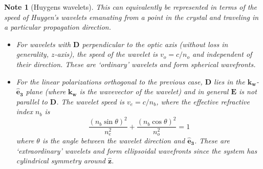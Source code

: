 \documentclass[a4paper]{article}
\theoremstyle{new}
\newtheorem{Note}{Note}[section]
\begin{document}
\begin{Note}[Huygens wavelets]
This can equivalently be represented in terms of the speed of Huygen's wavelets emanating from a point in the crystal and traveling in a particular propagation direction.
\begin{itemize}
    \item For wavelets with $\mathbf{D}$ perpendicular to the optic axis (without loss in generality, $z$-axis), the speed of the wavelet is $v_o=c/n_o$ and independent of their direction. These are `ordinary' wavelets and form spherical wavefronts.
    \item For the linear polarizations orthogonal to the previous case, $\mathbf{D}$ lies in the $\mathbf{k_w}$-$\mathbf{\hat{e}_3}$ plane (where $\mathbf{k_w}$ is the wavevector of the wavelet) and in general $\mathbf{E}$ is not parallel to $\mathbf{D}$. The wavelet speed is $v_e=c/n_b$, where the effective refractive index $n_b$ is
    $$\frac{(n_b\sin\theta)^2}{n_e^2}+\frac{(n_b\cos\theta)^2}{n_o^2}=1$$
    where $\theta$ is the angle between the wavelet direction and $\mathbf{\hat{e}_3}$. These are `extraordinary' wavelets and form ellipsoidal wavefronts since the system has cylindrical symmetry around $\mathbf{\hat{z}}$.
\end{itemize}
\end{Note}
\end{document}
